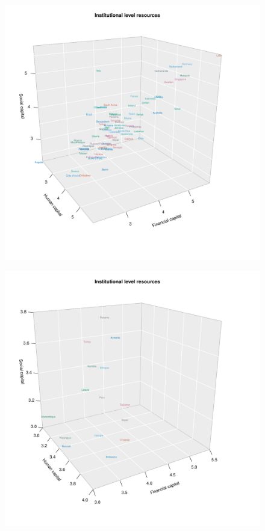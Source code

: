 \documentclass[
  english,
  man]{apa6}
\begin{document}
\begin{figure}[!H]
\includegraphics{Manuscript_files/figure-latex/unnamed-chunk-5-1} \caption{ }\label{fig:unnamed-chunk-5-1}
\end{figure}
\begin{figure}[!H]
\includegraphics{Manuscript_files/figure-latex/unnamed-chunk-5-2} \caption{ }\label{fig:unnamed-chunk-5-2}
\end{figure}
\end{document}
